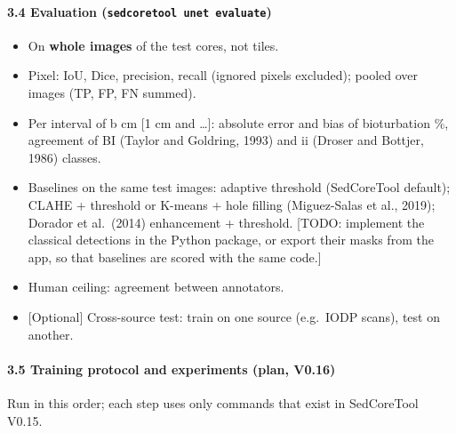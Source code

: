 \documentclass[
  10pt,
]{article}
\providecommand{\tightlist}{%
  \setlength{\itemsep}{0pt}\setlength{\parskip}{0pt}}
\begin{document}
\hypertarget{evaluation-sedcoretool-unet-evaluate}{%
\paragraph{\texorpdfstring{3.4 Evaluation
(\texttt{sedcoretool\ unet\ evaluate})}{3.4 Evaluation (sedcoretool unet evaluate)}}\label{evaluation-sedcoretool-unet-evaluate}}

\begin{itemize}
\tightlist
\item
  On \textbf{whole images} of the test cores, not tiles.
\item
  Pixel: IoU, Dice, precision, recall (ignored pixels excluded); pooled
  over images (TP, FP, FN summed).
\item
  Per interval of b cm {[}1 cm and \ldots{]}: absolute error and bias of
  bioturbation \%, agreement of BI (Taylor and Goldring, 1993) and ii
  (Droser and Bottjer, 1986) classes.
\item
  Baselines on the same test images: adaptive threshold (SedCoreTool
  default); CLAHE + threshold or K-means + hole filling (Miguez-Salas et
  al., 2019); Dorador et al.~(2014) enhancement + threshold. {[}TODO:
  implement the classical detections in the Python package, or export
  their masks from the app, so that baselines are scored with the same
  code.{]}
\item
  Human ceiling: agreement between annotators.
\item
  {[}Optional{]} Cross-source test: train on one source (e.g.~IODP
  scans), test on another.
\end{itemize}

\hypertarget{training-protocol-and-experiments-plan-v0.16}{%
\paragraph{3.5 Training protocol and experiments (plan,
V0.16)}\label{training-protocol-and-experiments-plan-v0.16}}

Run in this order; each step uses only commands that exist in
SedCoreTool V0.15.
\end{document}
